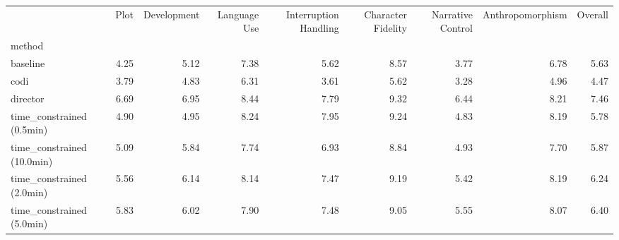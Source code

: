 \begin{tabular}{lrrrrrrrr}
\toprule
 & Plot & Development & Language Use & Interruption Handling & Character Fidelity & Narrative Control & Anthropomorphism & Overall \\
method &  &  &  &  &  &  &  &  \\
\midrule
baseline & 4.25 & 5.12 & 7.38 & 5.62 & 8.57 & 3.77 & 6.78 & 5.63 \\
codi & 3.79 & 4.83 & 6.31 & 3.61 & 5.62 & 3.28 & 4.96 & 4.47 \\
director & 6.69 & 6.95 & 8.44 & 7.79 & 9.32 & 6.44 & 8.21 & 7.46 \\
time_constrained (0.5min) & 4.90 & 4.95 & 8.24 & 7.95 & 9.24 & 4.83 & 8.19 & 5.78 \\
time_constrained (10.0min) & 5.09 & 5.84 & 7.74 & 6.93 & 8.84 & 4.93 & 7.70 & 5.87 \\
time_constrained (2.0min) & 5.56 & 6.14 & 8.14 & 7.47 & 9.19 & 5.42 & 8.19 & 6.24 \\
time_constrained (5.0min) & 5.83 & 6.02 & 7.90 & 7.48 & 9.05 & 5.55 & 8.07 & 6.40 \\
\bottomrule
\end{tabular}
